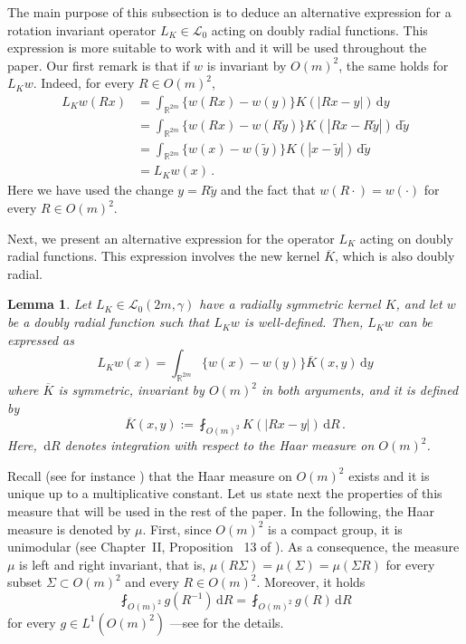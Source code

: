 \documentclass[12pt,reqno]{amsart}
\newtheorem{lemma}[theorem]{Lemma}
\theoremstyle{definition}
\theoremstyle{remark}
\newcommand{\con}[1]{\mathbb{#1}}
\newcommand{\R}{\con{R}} %
\newcommand{\lcal}{\mathcal{L}}
\newcommand{\s}{\gamma}
\renewcommand{\d}{\,\mathrm{d}} %
\newcommand{\average}{\fint}
\numberwithin{equation}{section}
\begin{document}
	The main purpose of this subsection is to deduce an alternative expression for a rotation invariant operator $L_K \in \lcal_0$ acting on doubly radial functions. This expression is more suitable to work with and it will be used throughout the paper. Our first remark is that if $w$ is invariant by $O(m)^2$, the same holds for $L_Kw$. Indeed, for every $R \in O(m)^2$,
	\begin{align*}
	L_K w (Rx)
	& = \int_{\R^{2m}} \{w(Rx) - w(y)\} K(|Rx - y|)  \d y\\
	& = \int_{\R^{2m}} \{w(Rx) - w(R\tilde{y})\} K(|Rx - R\tilde{y}|) \d \tilde{y}\\
	& = \int_{\R^{2m}} \{w(x) - w(\tilde{y})\} K(|x-\tilde{y}|) \d \tilde{y}\\
	& = L_K w (x)\,.
	\end{align*}
	Here we have used the change $y = R\tilde{y}$ and the fact that $w(R \cdot) = w(\cdot)$ for every $R\in O(m)^2$.
	
	Next, we present an alternative expression for the operator $L_K $ acting on doubly radial functions. This expression involves the new kernel $\overline{K}$, which is also doubly radial.
	
	\begin{lemma} \label{Lemma:AlternativeOperatorExpression}
		Let $L_K \in \lcal_0(2m,\s)$ have a radially symmetric kernel $K$, and let $w$ be a doubly radial function such that $L_K w$ is well-defined. Then, $L_K w$ can be expressed as
		$$
		L_K w(x) = \int_{\R^{2m}} \{w(x) - w(y)\} \overline{K}(x,y) \d y
		$$
		where $\overline{K}$ is symmetric, invariant by $O(m)^2$ in both arguments, and it is defined by
		\begin{equation*}
		\overline{K}(x,y) := \average_{O(m)^2} K(|Rx - y|)\d R\,.
		\end{equation*}
		Here, $\d R$ denotes integration with respect to the Haar measure on $O(m)^2$.
	\end{lemma}
	
	Recall (see for instance \cite{Nachbin}) that the Haar measure on $O(m)^2$ exists and it is unique up to a
	multiplicative constant. Let us state next the properties of this measure that will be used in the rest of the
	paper. In the following, the Haar measure is denoted by $\mu$. First, since $O(m)^2$ is a compact
	group, it is unimodular (see Chapter~II, Proposition~ 13 of \cite{Nachbin}). As a consequence, the
	measure $\mu$ is left and right invariant, that is, $\mu(R\Sigma) = \mu(\Sigma) = \mu(\Sigma R) $
	for every subset $\Sigma \subset O(m)^2$ and every $R\in O(m)^2$. Moreover, it holds
	\begin{equation}
	\label{Eq:Unimodular}
	\average_{O(m)^2} g(R^{-1}) \d R = \average_{O(m)^2} g(R) \d R
	\end{equation}	
	for every $g\in L^1(O(m)^2)$ ---see \cite{Nachbin} for the details.
	
\end{document}
